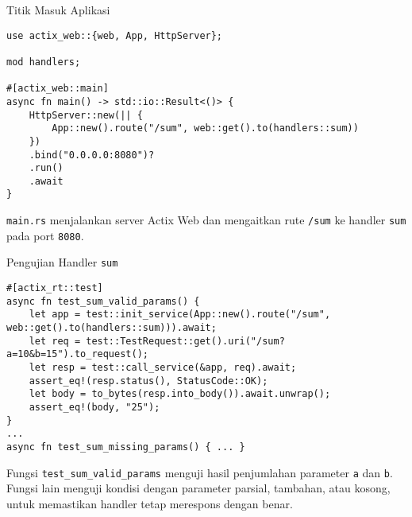 \documentclass[aspectratio=169, table]{beamer}
\begin{document}
\begin{frame}[fragile]{Titik Masuk Aplikasi}
	\vspace{20pt}
\begin{lstlisting}[style=RustStyle]
use actix_web::{web, App, HttpServer};

mod handlers;

#[actix_web::main]
async fn main() -> std::io::Result<()> {
	HttpServer::new(|| {
		App::new().route("/sum", web::get().to(handlers::sum))
	})
	.bind("0.0.0.0:8080")?
	.run()
	.await
}
\end{lstlisting}

\texttt{main.rs} menjalankan server Actix Web dan mengaitkan rute \texttt{/sum} ke handler \texttt{sum} pada port \texttt{8080}.
\end{frame}

\begin{frame}[fragile]{Pengujian Handler \texttt{sum}}
	\vspace{20pt}
\begin{lstlisting}[style=RustStyle]
#[actix_rt::test]
async fn test_sum_valid_params() {
	let app = test::init_service(App::new().route("/sum", web::get().to(handlers::sum))).await;
	let req = test::TestRequest::get().uri("/sum?a=10&b=15").to_request();
	let resp = test::call_service(&app, req).await;
	assert_eq!(resp.status(), StatusCode::OK);
	let body = to_bytes(resp.into_body()).await.unwrap();
	assert_eq!(body, "25");
}
...
async fn test_sum_missing_params() { ... }
\end{lstlisting}

Fungsi \texttt{test\_sum\_valid\_params} menguji hasil penjumlahan parameter \texttt{a} dan \texttt{b}. Fungsi lain menguji kondisi dengan parameter parsial, tambahan, atau kosong, untuk memastikan handler tetap merespons dengan benar.
\end{frame}
\end{document}
